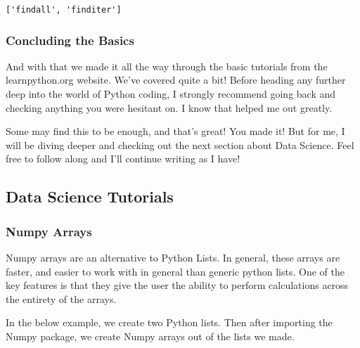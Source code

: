 \documentclass[11pt]{article}
\begin{document}
    \begin{Verbatim}[commandchars=\\\{\}]
['findall', 'finditer']

    \end{Verbatim}

    \subsubsection{Concluding the Basics}\label{concluding-the-basics}

And with that we made it all the way through the basic tutorials from
the learnpython.org website. We've covered quite a bit! Before heading
any further deep into the world of Python coding, I strongly recommend
going back and checking anything you were hesitant on. I know that
helped me out greatly.

Some may find this to be enough, and that's great! You made it! But for
me, I will be diving deeper and checking out the next section about Data
Science. Feel free to follow along and I'll continue writing as I have!

\subsection{Data Science Tutorials}\label{data-science-tutorials}

\subsubsection{Numpy Arrays}\label{numpy-arrays}

Numpy arrays are an alternative to Python Lists. In general, these
arrays are faster, and easier to work with in general than generic
python lists. One of the key features is that they give the user the
ability to perform calculations across the entirety of the arrays.

In the below example, we create two Python lists. Then after importing
the Numpy package, we create Numpy arrays out of the lists we made.
\end{document}
